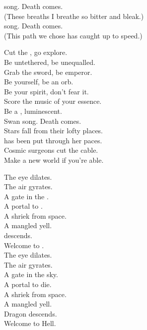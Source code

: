  song. Death comes. \\
(These breaths I breathe so bitter and bleak.) \\
 song. Death comes. \\
(This path we chose has caught up to speed.) \\


Cut the , go explore. \\
Be untethered, be unequalled. \\
Grab the sword, be emperor. \\
Be yourself, be an orb. \\
Be your spirit, don't fear it. \\
Score the music of your essence. \\
Be a , luminescent. \\
Swan song. Death comes. \\

Stars fall from their lofty places. \\
 has been put through her paces. \\
Cosmic surgeons cut the cable. \\
Make a new world if you're able. \\


The eye dilates. \\
The air gyrates. \\
A gate in the . \\
A portal to . \\
A shriek from space. \\
A mangled yell. \\
 descends. \\
Welcome to . \\

The eye dilates. \\
The air gyrates. \\
A gate in the sky. \\
A portal to die. \\
A shriek from space. \\
A mangled yell. \\
Dragon descends. \\
Welcome to Hell. \\


